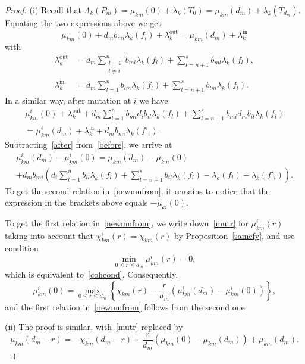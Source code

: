\documentclass{amsart}
\theoremstyle{definition}
\theoremstyle{remark}
\numberwithin{equation}{section}
\numberwithin{theorem}{section}
\begin{document}
\begin{proof}
(i) Recall that $\Lambda_k(P_m)=\mu_{km}(0)+\lambda_k(T_0)=\mu_{km}(d_m)+\lambda_k(T_{d_m})$. Equating the two expressions above we get
\begin{equation}\label{before}
\mu_{km}(0)%
+d_mb_{mi}\lambda_k(f_i)+\lambda_k^{\mathrm {out}}
=\mu_{km}(d_m)%
+\lambda_k^{\mathrm {in}}
\end{equation}
with
\begin{align*}
\lambda_k^{\mathrm {out}}&=d_m\sum_{\substack{l=1\\l\ne i}}^nb_{ml}\lambda_k(f_l)+\sum_{l=n+1}^sb_{ml}\lambda_k(f_l),\\
\lambda_k^{\mathrm {in}}&=d_m\sum_{l=1}^nb_{lm}\lambda_k(f_l)+\sum_{l=n+1}^sb_{lm}\lambda_k(f_l).
\end{align*}
In a similar way, after mutation at $i$ we have
\begin{multline}\label{after}
\mu_{km}^i(0)%
+\lambda_k^{\mathrm {out}}+d_m\sum_{l=1}^nb_{mi}d_ib_{il}\lambda_k(f_l)
+\sum_{l=n+1}^sb_{mi}d_mb_{il}\lambda_k(f_l)\\
=\mu_{km}^i(d_m)%
+\lambda_k^{\mathrm {in}}+d_mb_{mi}\lambda_k(f'_i).
\end{multline}
Subtracting~\eqref{after} from~\eqref{before}, 
we arrive at
\begin{multline*}
\mu_{km}^i(d_m)-\mu_{km}^i(0)=\mu_{km}(d_m)-\mu_{km}(0)\\
+d_mb_{mi}\left(d_i\sum_{l=1}^nb_{il}\lambda_k(f_l)
+\sum_{l=n+1}^sb_{il}\lambda_k(f_l)-\lambda_k(f_i)-\lambda_k(f'_i)\right).
\end{multline*}
To get the second relation in~\eqref{newmufrom}, it remains to notice that the expression in the brackets above equals
$-\mu_{ki}(0)$.

To get the first relation in~\eqref{newmufrom}, we write down~\eqref{mutr} for $\mu_{km}^i(r)$ 
taking into account that $\chi^i_{km}(r)=\chi_{km}(r)$ by Proposition~\ref{samefy},
and use condition
\[\min_{0\le r\le d_m}\mu_{km}^i(r)=0,\] 
which is equivalent to~\eqref{cohcond}. Consequently,
\[
\mu_{km}^i(0)=\max_{0\le r\le d_m}\left\{\chi_{km}(r)-\frac r{d_m}\left(\mu_{km}^i(d_m)-\mu_{km}^i(0)\right)\right\},
\]
and the first relation in~\eqref{newmufrom} follows from the second one.

(ii) The proof is similar, with~\eqref{mutr} replaced by
\[
\mu_{km}(d_m-r)=-\chi_{km}(d_m-r)+\frac r{d_m}(\mu_{km}(0)-\mu_{km}(d_m))+\mu_{km}(d_m).
\]
\end{proof}
\end{document}
